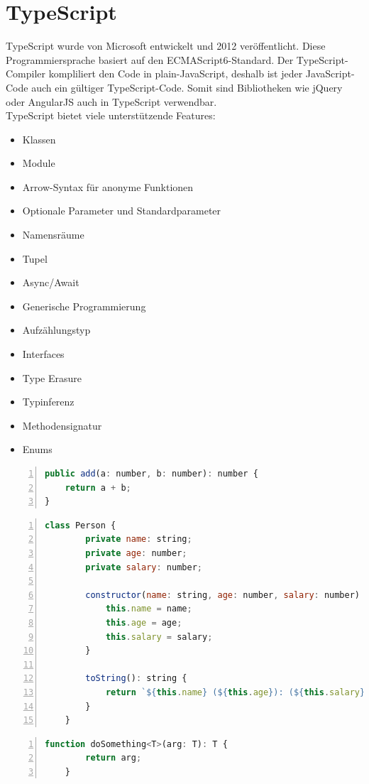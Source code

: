 \section{TypeScript}
TypeScript wurde von Microsoft entwickelt und 2012 veröffentlicht. Diese Programmiersprache basiert auf den ECMAScript6-Standard. Der TypeScript-Compiler kompliliert den Code in plain-JavaScript, deshalb ist jeder JavaScript-Code auch ein gültiger TypeScript-Code. Somit sind Bibliotheken wie jQuery oder AngularJS auch in TypeScript verwendbar. \autocite{wikiTypeScript} \\

TypeScript bietet viele unterstützende Features:

\begin{itemize}
	\item Klassen
	\item Module
	\item Arrow-Syntax für anonyme Funktionen
	\item Optionale Parameter und Standardparameter
	\item Namensräume
	\item Tupel
	\item Async/Await
	\item Generische Programmierung
	\item Aufzählungstyp
	\item Interfaces
	\item Type Erasure
	\item Typinferenz
	\item Methodensignatur
	\item Enums
\end{itemize}

\begin{lstlisting}[caption={TypeScript-Beispiel Function},captionpos=b, numbers=left, backgroundcolor=\color{black!10},language=JavaScript]
public add(a: number, b: number): number {
	return a + b;
}
\end{lstlisting}

\begin{lstlisting}[caption={TypeScript-Beispiel Klasse},captionpos=b, numbers=left, backgroundcolor=\color{black!10},language=JavaScript]
	class Person {
		private name: string;
		private age: number;
		private salary: number;
		
		constructor(name: string, age: number, salary: number) {
			this.name = name;
			this.age = age;
			this.salary = salary;
		}
		
		toString(): string {
			return `${this.name} (${this.age}): (${this.salary})`;
		}
	}
\end{lstlisting}
\begin{lstlisting}[caption={TypeScript-Beispiel Generische Programmierung},captionpos=b, numbers=left, backgroundcolor=\color{black!10},language=JavaScript]
	function doSomething<T>(arg: T): T {
		return arg;
	}
\end{lstlisting}


